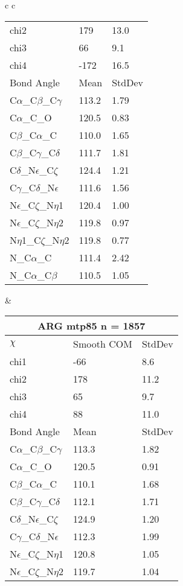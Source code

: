 \begin{longtable}{ c c }
\begin{tabular}{ l l l }
  chi2 & 179 & 13.0 \\ 
  chi3 & 66 & 9.1 \\ 
  chi4 & -172 & 16.5 \\ \midrule
  Bond Angle   & Mean     & StdDev \\ \midrule
  C$\alpha$\_C$\beta$\_C$\gamma$ & 113.2 & 1.79\\
  C$\alpha$\_C\_O & 120.5 & 0.83\\
  C$\beta$\_C$\alpha$\_C & 110.0 & 1.65\\
  C$\beta$\_C$\gamma$\_C$\delta$ & 111.7 & 1.81\\
  C$\delta$\_N$\epsilon$\_C$\zeta$ & 124.4 & 1.21\\
  C$\gamma$\_C$\delta$\_N$\epsilon$ & 111.6 & 1.56\\
  N$\epsilon$\_C$\zeta$\_N$\eta$1 & 120.4 & 1.00\\
  N$\epsilon$\_C$\zeta$\_N$\eta$2 & 119.8 & 0.97\\
  N$\eta$1\_C$\zeta$\_N$\eta$2 & 119.8 & 0.77\\
  N\_C$\alpha$\_C & 111.4 & 2.42\\
  N\_C$\alpha$\_C$\beta$ & 110.5 & 1.05\\
  \bottomrule
  \end{tabular}
  &
  \begin{tabular}{ l l l }
  \toprule
  \multicolumn{3}{c}{ARG \textbf{mtp85} n = 1857} \\ \toprule
  $\chi$       & Smooth COM & StdDev \\ \midrule
  chi1 & -66 & 8.6 \\ 
  chi2 & 178 & 11.2 \\ 
  chi3 & 65 & 9.7 \\ 
  chi4 & 88 & 11.0 \\ \midrule
  Bond Angle   & Mean     & StdDev \\ \midrule
  C$\alpha$\_C$\beta$\_C$\gamma$ & 113.3 & 1.82\\
  C$\alpha$\_C\_O & 120.5 & 0.91\\
  C$\beta$\_C$\alpha$\_C & 110.1 & 1.68\\
  C$\beta$\_C$\gamma$\_C$\delta$ & 112.1 & 1.71\\
  C$\delta$\_N$\epsilon$\_C$\zeta$ & 124.9 & 1.20\\
  C$\gamma$\_C$\delta$\_N$\epsilon$ & 112.3 & 1.99\\
  N$\epsilon$\_C$\zeta$\_N$\eta$1 & 120.8 & 1.05\\
  N$\epsilon$\_C$\zeta$\_N$\eta$2 & 119.7 & 1.04\\

\end{tabular}
\end{longtable}
